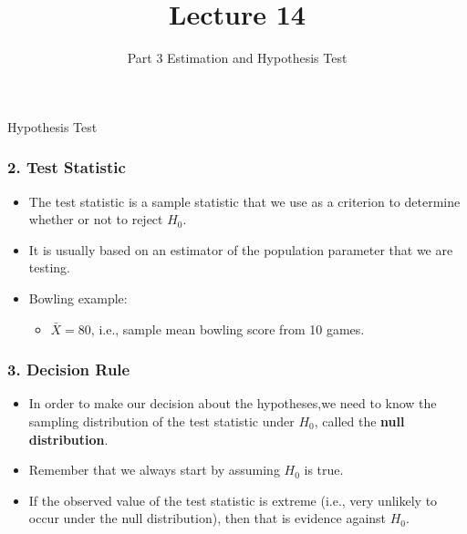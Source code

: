 \documentclass[12pt]{beamer}
\title[ECON2843]{Lecture 14}
\subtitle{Part 3 Estimation and Hypothesis Test}
\date{}
\begin{document}
	\begin{frame}
		\titlepage
	\end{frame}
	\begin{frame}
		\vspace{1cm}
		\centering
		{\color{blue}\large Hypothesis Test}
	\end{frame}
	
\begin{frame}
	\frametitle{2. Test Statistic}
	
	\begin{itemize}[label={\color{blue}$\blacktriangleright$}]
		\item The test statistic is a sample statistic that we use as a criterion to determine whether or not to reject $H_0$.
		\item It is usually based on an estimator of the population parameter that we are testing.
		\item Bowling example:
		\begin{itemize}[label={\color{blue}$\blacktriangleright$}]
			\item $\bar{X} = 80$, i.e., sample mean bowling score from 10 games.
		\end{itemize}
	\end{itemize}
	
\end{frame}
\begin{frame}
	\frametitle{3. Decision Rule}
	
	\begin{itemize}[label={\color{blue}$\blacktriangleright$}]
		\item In order to make our decision about the hypotheses,we need to know the sampling distribution of the test statistic under $H_0$, called the {\bf null distribution}.
		\item Remember that we always start by assuming $H_0$ is true.
		\item {\color{red}If the observed value of the test statistic is extreme (i.e., very unlikely to occur under the null distribution), then that is evidence against $H_0$.}
	\end{itemize}
	
\end{frame}
\end{document}
